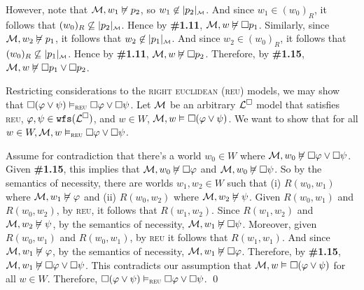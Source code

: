 \documentclass[a4paper, 11pt]{article}                  %
\begin{document}
\begin{enumerate}
{        However, note that $\M, w_1 \not\MLmodels p_2$, so $w_1 \not\in \interpret{\M}{p_2}$. 
        And since $w_1 \in (w_0)_R$, it follows that $(w_0)_R \not\subseteq \interpret{\M}{p_2}$. Hence by \textbf{\#1.11}, $\M, w \not \MLmodels \Box p_1$.
        Similarly, since $\M, w_2 \not\MLmodels p_1$, it follows that $w_2 \not\in \interpret{\M}{p_1}$. 
        And since $w_2 \in (w_0)_R$, it follows that $(w_0)_R \not \subseteq \interpret{\M}{p_1}$. Hence by \textbf{\#1.11}, $\M, w \not \MLmodels \Box p_2$. 
        Therefore, by \textbf{\#1.15}, $\M, w \not \MLmodels \Box p_1 \lor \Box p_2$. 

        \medskip 

        Restricting considerations to the \textsc{right euclidean (reu)} models, we may show that $\Box(\metaA \lor \metaB) \MLmodels[\textsc{reu}] \Box \metaA \lor \Box \metaB$. 
        Let $\M$ be an arbitrary $\ML$ model that satisfies \textsc{reu}, $\metaA, \metaB \in \wfs{\ML}$, and $w \in W$, $\M, w \MLmodels \Box(\metaA \lor \metaB)$. 
        We want to show that for all $w \in W, \M, w \MLmodels[\textsc{reu}] \Box \metaA \lor \Box \metaB$.
        
        Assume for contradiction that there's a world $w_0 \in W$ where $\M, w_0 \not \MLmodels \Box \metaA \lor \Box \metaB$. 
        Given \textbf{\#1.15}, this implies that $\M, w_0 \not \MLmodels \Box \metaA$ and $\M, w_0 \not \MLmodels \Box \metaB$. 
        So by the semantics of necessity, there are worlds $w_1, w_2 \in W$ such that (i) $R(w_0,w_1)$ where $\M, w_1 \not\MLmodels \metaA$ and (ii) $R(w_0,w_2)$ where $\M, w_2 \not\MLmodels \metaB$. 
        Given $R(w_0,w_1)$ and $R(w_0,w_2)$, by \textsc{reu}, it follows that $R(w_1, w_2)$. Since $R(w_1,w_2)$ and $\M,w_2 \not\MLmodels \metaB$, by the semantics of necessity, $\M, w_1 \not \MLmodels \Box \metaB$. 
        Moreover, given $R(w_0, w_1)$ and $R(w_0, w_1)$, by \textsc{reu} it follows that $R(w_1,w_1)$. %
        And since $\M,w_1 \not\MLmodels \metaA$, by the semantics of necessity, $\M, w_1 \not \MLmodels \Box \metaA$. 
        Therefore, by \textbf{\#1.15}, $\M, w_1 \not \MLmodels \Box \metaA \lor \Box \metaB$. 
        This contradicts our assumption that $\M, w \MLmodels \Box(\metaA \lor \metaB)$ for all $w \in W$. 
        Therefore, $\Box(\metaA \lor \metaB) \MLmodels[\textsc{reu}] \Box \metaA \lor \Box \metaB$.
        \qed
      }


\end{enumerate}
\end{document}
